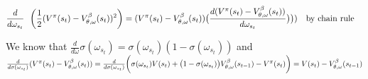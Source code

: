 \begin{align}
    \frac{d}{d\omega_{s_t}} \ \ &\bigg( \frac{1}{2}(V^{\pi}(s_t) - V^{\beta}_{\theta,\omega}(s_t))^2  \bigg) =(V^{\pi}(s_t) - V^{\beta}_{\theta,\omega}(s_t)) \big(\frac{d (V^{\pi}(s_t) - V^{\beta}_{\theta,\omega}(s_t))}{d\omega_{s_t}} \big) 
     \big) )  \ \ \ \text{by chain rule}
\end{align}

We know that $\frac{d}{d\omega} \sigma(\omega_{s_t})=\sigma(\omega_{s_t})(1 - \sigma(\omega_{s_t}))$ \newline
and $\frac{d}{d\sigma(\omega_{s_t})} (V^{\pi}(s_t) - V^{\beta}_{\theta,\omega}(s_t)) = \frac{d}{d\sigma(\omega_{s_t})} \bigg(\sigma(\omega_{s_t})V(s_t) + \big(1 - \sigma(\omega_{s_t})\big)V^{\beta}_{\theta,\omega}(s_{t-1}) - V^{\pi}(s_t)\bigg) = V(s_t) - V^{\beta}_{\theta,\omega}(s_{t-1})$ \newline \newline

